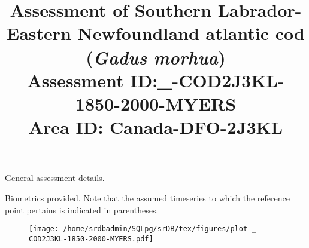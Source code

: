 \documentclass[a4paper,10pt]{article}
\title{Assessment of Southern Labrador-Eastern Newfoundland atlantic cod (\textit{Gadus morhua})\\{\large Assessment ID:_-COD2J3KL-1850-2000-MYERS \\Area ID: Canada-DFO-2J3KL}}
\date{}
\begin{document}
\maketitle
\thispagestyle{empty}
\vspace*{-.75in}
\begin{center}
{\large General assessment details.}
\end{center}

\begin{center}
{\large Biometrics provided. Note that the assumed timeseries to which the reference point pertains is indicated in parentheses.}
\begin{table}[htb]
\centering


\end{table}
\end{center}
%
\pagebreak
\vspace*{1cm}

\begin{figure}[htbp] %
   \centering
   \texttt{[image: /home/srdbadmin/SQLpg/srDB/tex/figures/plot-\_-COD2J3KL-1850-2000-MYERS.pdf]} 
\end{figure}
\end{document}
